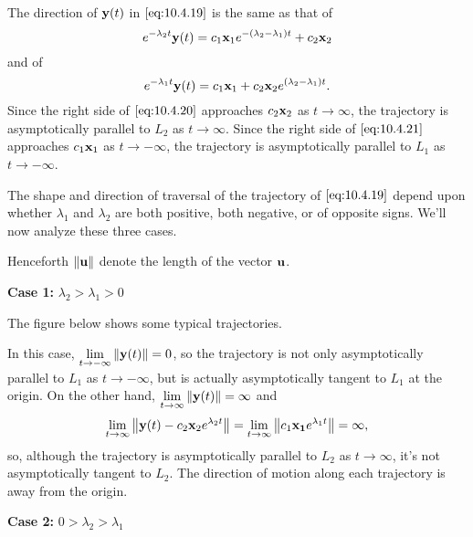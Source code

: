 \documentclass{ximera}
\begin{document}
The direction of ${\bf y}(t)$ in $\eqref{eq:10.4.19}$ is the
same as that of
\begin{equation} \label{eq:10.4.20}
e^{-\lambda_2 t}{\bf y}(t)=
c_1{\bf x}_1e^{-(\lambda_2-\lambda_1)t}+c_2{\bf x}_2
\end{equation}
and of
\begin{equation} \label{eq:10.4.21}
e^{-\lambda_1 t}{\bf y}(t)=c_1{\bf
x}_1+c_2{\bf x}_2e^{(\lambda_2-\lambda_1)t}.
\end{equation}
Since the right side of $\eqref{eq:10.4.20}$ approaches $c_2{\bf x}_2$ as
$t\rightarrow\infty$, the trajectory is asymptotically parallel to $L_2$ as
$t\rightarrow\infty$. Since the right side of $\eqref{eq:10.4.21}$ approaches
$c_1{\bf x}_1$ as $t\rightarrow-\infty$, the trajectory is asymptotically
parallel to $L_1$ as $t\rightarrow -\infty$.

The shape and direction of
traversal of the trajectory of $\eqref{eq:10.4.19}$ depend upon whether
$\lambda_1$ and $\lambda_2$ are both positive, both negative, or of
opposite signs. We'll now analyze these three cases.

Henceforth $\left\lVert{\bf u}\right\rVert$  denote the length of the vector
${\bf u}$.




{\bf Case 1:} $\lambda_2>\lambda_1>0$

The figure below  shows some
 typical trajectories.

\begin{center}
\end{center}

 
In this case, $\lim_{t\rightarrow -\infty}\norm{{\bf y}(t)}=0$, so the trajectory
is not only asymptotically parallel to $L_1$ as $t\rightarrow -\infty$, but is
actually asymptotically tangent to $L_1$ at the origin. On
the other hand, $\lim_{t\rightarrow\infty}\norm{{\bf y}(t)}=\infty$ and
$$
\lim_{t\rightarrow\infty}\norm{{\bf y}(t)-c_2{\bf x}_2e^{\lambda_2
t}}=\lim_{t\rightarrow\infty}\norm{c_1{\bf x_1}e^{\lambda_1t}}=\infty,
$$
so, although the trajectory is asymptotically parallel to $L_2$ as
$t\rightarrow\infty$, it's not asymptotically tangent to $L_2$.
The direction of motion along each trajectory is away from the origin.

{\bf Case 2:} $0>\lambda_2>\lambda_1$
\end{document}
